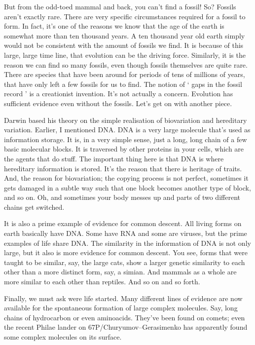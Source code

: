 \begin{multicols}{2}
But from the odd-toed mammal and back, you can't find a fossil! So? Fossils aren't exactly rare. There are very specific circumstances required for a fossil to form. In fact, it's one of the reasons we know that the age of the earth is somewhat more than ten thousand years. A ten thousand year old earth simply would not be consistent with the amount of fossils we find. It is because of this large, large time line, that evolution can be the driving force. Similarly, it is the reason we can find so many fossils, even though fossils themselves are quite rare. There are species that have been around for periods of tens of millions of years, that have only left a few fossils for us to find. The notion of ‘ gaps in the fossil record ’ is a creationist invention. It's not actually a concern. Evolution has sufficient evidence even without the fossils. Let's get on with another piece.

Darwin based his theory on the simple realisation of biovariation and hereditary variation. Earlier, I mentioned DNA. DNA is a very large molecule that's used as information storage. It is, in a very simple sense, just a long, long chain of a few basic molecular blocks. It is traversed by other proteins in your cells, which are the agents that do stuff. The important thing here is that DNA is where hereditary information is stored. It's the reason that there is heritage of traits. And, the reason for biovariation; the copying process is not perfect, sometimes it gets damaged in a subtle way such that one block becomes another type of block, and so on. Oh, and sometimes your body messes up and parts of two different chains get switched.

It is also a prime example of evidence for common descent. All living forms on earth basically have DNA. Some have RNA and some are viruses, but the prime examples of life share DNA. The similarity in the information of DNA is not only large, but it also is more evidence for common descent. You see, forms that were taught to be similar, say, the large cats, show a larger genetic similarity to each other than a more distinct form, say, a simian. And mammals as a whole are more similar to each other than reptiles. And so on and so forth.

Finally, we must ask were life started. Many different lines of evidence are now available for the spontaneous formation of large complex molecules. Say, long chains of hydrocarbon or even aminoacids. They've been found on comets; even the recent Philae lander on 67P/Churyumov–Gerasimenko has apparently found some complex molecules on its surface.


\end{multicols}
